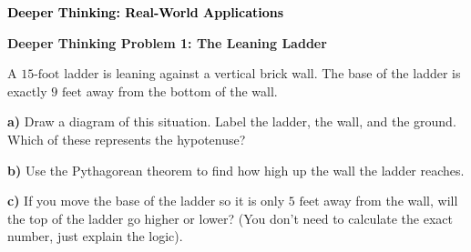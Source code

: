 \documentclass[12pt, letterpaper, fleqn]{article}
\begin{document}
\newpage

\begin{tcolorbox}[colback=customteal!20]
\large\textcolor{black}{\textbf{Deeper Thinking: Real-World Applications}}
\end{tcolorbox}

\vspace{3mm}

\begin{tcolorbox}[colback=white!15, colframe=black, boxrule=1.5pt, arc=4mm, left=6mm, right=6mm, top=5mm, bottom=5mm]

\textbf{Deeper Thinking Problem 1: The Leaning Ladder}

\medskip

\noindent
A $15\text{-foot}$ ladder is leaning against a vertical brick wall. The base of the ladder is exactly $9\text{ feet}$ away from the bottom of the wall. 

\vspace{5mm}

\noindent
\textbf{a)} Draw a diagram of this situation. Label the ladder, the wall, and the ground. Which of these represents the hypotenuse?

\vspace{4cm}

\noindent
\textbf{b)} Use the Pythagorean theorem to find how high up the wall the ladder reaches.

\vspace{4cm}

\noindent
\textbf{c)} If you move the base of the ladder so it is only $5\text{ feet}$ away from the wall, will the top of the ladder go higher or lower? (You don't need to calculate the exact number, just explain the logic).

\vspace{2.5cm}

\end{tcolorbox}
\end{document}
